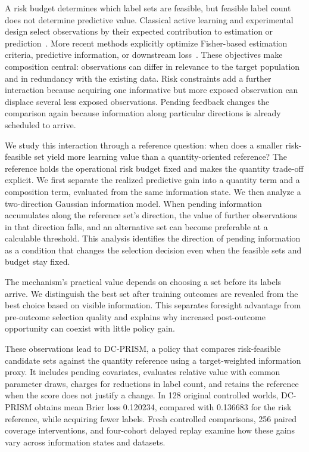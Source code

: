\documentclass[runningheads]{llncs}
\begin{document}
A risk budget determines which label sets are feasible, but feasible label count does not determine predictive value. Classical active learning and experimental design select observations by their expected contribution to estimation or prediction~\cite{cohn1996active,yu2006transductive}. More recent methods explicitly optimize Fisher-based estimation criteria, predictive information, or downstream loss~\cite{ash2021fishing,bickfordsmith2023prediction,huang2026loss}. These objectives make composition central: observations can differ in relevance to the target population and in redundancy with the existing data. Risk constraints add a further interaction because acquiring one informative but more exposed observation can displace several less exposed observations. Pending feedback changes the comparison again because information along particular directions is already scheduled to arrive.

We study this interaction through a reference question: when does a smaller risk-feasible set yield more learning value than a quantity-oriented reference? The reference holds the operational risk budget fixed and makes the quantity trade-off explicit. We first separate the realized predictive gain into a quantity term and a composition term, evaluated from the same information state. We then analyze a two-direction Gaussian information model. When pending information accumulates along the reference set's direction, the value of further observations in that direction falls, and an alternative set can become preferable at a calculable threshold. This analysis identifies the direction of pending information as a condition that changes the selection decision even when the feasible sets and budget stay fixed.

The mechanism's practical value depends on choosing a set before its labels arrive. We distinguish the best set after training outcomes are revealed from the best choice based on visible information. This separates foresight advantage from pre-outcome selection quality and explains why increased post-outcome opportunity can coexist with little policy gain.

These observations lead to DC-PRISM, a policy that compares risk-feasible candidate sets against the quantity reference using a target-weighted information proxy. It includes pending covariates, evaluates relative value with common parameter draws, charges for reductions in label count, and retains the reference when the score does not justify a change. In 128 original controlled worlds, DC-PRISM obtains mean Brier loss 0.120234, compared with 0.136683 for the risk reference, while acquiring fewer labels. Fresh controlled comparisons, 256 paired coverage interventions, and four-cohort delayed replay examine how these gains vary across information states and datasets.
\end{document}
